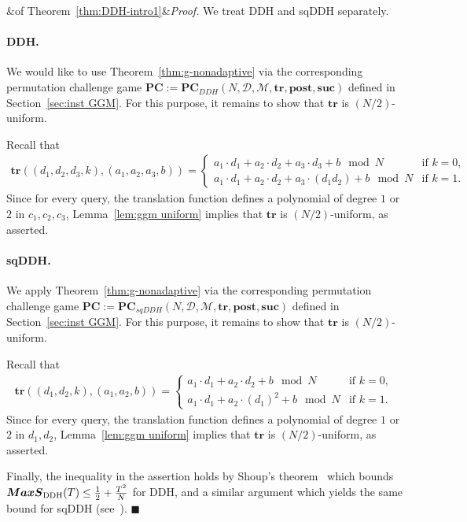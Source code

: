 \documentclass[11pt]{article}
\renewenvironment{proof}[1][]
    {\noindent
       \ifx&#1&{\it Proof.}
       \else{\it Proof ({#1}).}
       \fi}{\hfill $\blacksquare$}
\newcommand{\SECS}{{\mathcal{D}}}
\newcommand{\SUC}{\boldsymbol{suc}}
\newcommand{\TR}{\boldsymbol{tr}}
\newcommand{\POST}{\boldsymbol{post}}
\newcommand{\PC}{\boldsymbol{PC}}
\newcommand{\MAXS}{\boldsymbol{MaxS}}
\begin{document}
\medskip

\begin{proof}[of Theorem~\ref{thm:DDH-intro1}]
We treat DDH and sqDDH separately.

\paragraph{DDH.} We would like to use Theorem~\ref{thm:g-nonadaptive} via the corresponding permutation challenge game
$\PC := \PC_{DDH}(N,\SECS,\mathcal{M},\TR,\POST,\SUC)$
defined in Section~\ref{sec:inst GGM}. For this purpose, it remains to show that 
$\TR$ is $(N/2)$-uniform.

Recall that 
\begin{align*}
\TR((d_1,d_2,d_3,k),(a_1,a_2,a_3,b) ) =
\begin{cases}
a_1 \cdot d_{1} + a_2 \cdot d_{2} + a_3 \cdot d_{3} + b \mod N & \text{if } k=0, \\
a_1 \cdot d_{1} + a_2 \cdot d_{2} + a_3 \cdot (d_{1} d_{2}) + b \mod N & \text{if } k = 1.
\end{cases}
\end{align*}
Since for every query, the translation function defines a polynomial of degree $1$ or $2$ in $c_1,c_2,c_3$,
Lemma~\ref{lem:ggm uniform} implies that $\TR$ is $(N/2)$-uniform, as asserted.

\paragraph{sqDDH.}
We apply Theorem~\ref{thm:g-nonadaptive} via the corresponding permutation challenge game
$\PC := \PC_{sqDDH}(N,\SECS,\mathcal{M},\TR,\POST,\SUC)$
defined in Section~\ref{sec:inst GGM}. For this purpose, it remains to show that 
$\TR$ is $(N/2)$-uniform.

Recall that 
\begin{align*}
\TR((d_1,d_2,k),(a_1,a_2,b) ) =
\begin{cases}
a_1 \cdot d_{1} + a_2 \cdot d_{2}  + b \mod N & \text{if } k=0, \\
a_1 \cdot d_{1} + a_2 \cdot (d_{1})^2 + b \mod N & \text{if } k = 1.
\end{cases}
\end{align*}
Since for every query, the translation function defines a polynomial of degree $1$ or $2$ in $d_1,d_2$,
Lemma~\ref{lem:ggm uniform} implies that $\TR$ is $(N/2)$-uniform, as asserted.

Finally, the inequality in the assertion holds by Shoup's theorem~\cite{Shoup97} which bounds $\MAXS_{\textup{DDH}}(T) \leq \frac{1}{2} +\frac{T^2}{N}$ for DDH, and a similar argument which yields the same bound for sqDDH (see~\cite{CorettiDG18}).
\end{proof}
\end{document}
